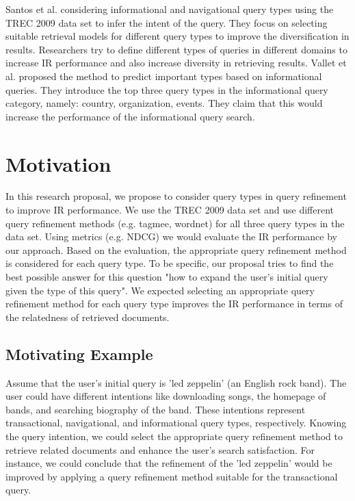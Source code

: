 \documentclass[sigconf]{acmart}
\begin{document}
Santos et al. \cite{zhanargoverse} considering informational and navigational query types using the TREC 2009 data set \cite{clarke2009overview} to infer the intent of the query. They focus on selecting suitable retrieval models for different query types to improve the diversification in results. Researchers try to define different types of queries in different domains to increase IR performance and also increase diversity in retrieving results. Vallet et al. \cite{vallet2008inferring} proposed the method to predict important types based on informational queries. They introduce the top three query types in the informational query category, namely: country, organization, events. They claim that this would increase the performance of the informational query search. 


\section{Motivation}
In this research proposal, we propose to consider query types in query refinement to improve IR performance. We use the TREC 2009 data set \cite{clarke2009overview} and use different query refinement methods (e.g. tagmee, wordnet) for all three query types in the data set. Using metrics (e.g. NDCG) we would evaluate the IR performance by our approach. Based on the evaluation, the appropriate query refinement method is considered for each query type. To be specific, our proposal tries to find the best possible answer for this question "how to expand the user's initial query given the type of this query". We expected selecting an appropriate query refinement method for each query type improves the IR performance in terms of the relatedness of retrieved documents.

\subsection{Motivating Example}
Assume that the user's initial query is 'led zeppelin' (an English rock band). The user could have different intentions like downloading songs, the homepage of bands, and searching biography of the band. These intentions represent transactional, navigational, and informational query types, respectively. Knowing the query intention, we could select the appropriate query refinement method to retrieve related documents and enhance the user's search satisfaction. For instance, we could conclude that the refinement of the 'led zeppelin' would be improved by applying a query refinement method suitable for the transactional query.
\end{document}
